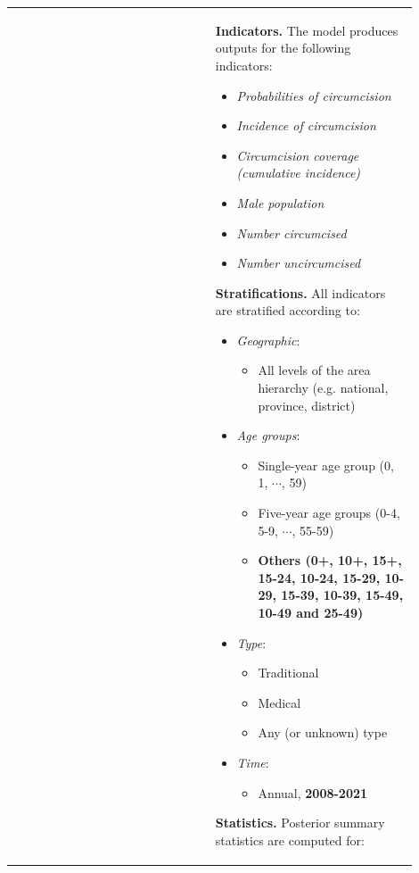 \documentclass{article}
\begin{document}
\begin{appendix}
{\begin{table}[H]
\begin{tabular}{| p{0.45\linewidth} | p{0.45\linewidth} |}
		& 
			{\bf Indicators.}  The model produces outputs for the following indicators:
			\begin{itemize}
				\item {\it Probabilities of circumcision}
                \item {\it Incidence of circumcision}
				\item {\it Circumcision coverage (cumulative incidence)}
				\item {\it Male population}
				\item {\it Number circumcised}
				\item {\it Number uncircumcised}
			\end{itemize}
			\vspace{5pt}
			{\bf Stratifications.} All indicators are stratified according to: 
			\begin{itemize}
				\item {\it Geographic}: 
				\begin{itemize}
					\item All levels of the area hierarchy (e.g. national, province, district)
				\end{itemize}
				\item {\it Age groups}: 
				\begin{itemize}
					\item Single-year age group (0, 1, $\cdots$, 59)
					\item Five-year age groups (0-4, 5-9, $\cdots$, 55-59)
					\item {\color{red}\bf Others (0+, 10+, 15+, 15-24, 10-24, 15-29, 10-29, 15-39, 10-39, 15-49, 10-49 and 25-49)}
				\end{itemize}
				\item {\it Type}: 
				\begin{itemize}
					\item Traditional
					\item Medical 
					\item Any (or unknown) type 
				\end{itemize}
				\item {\it Time}: 
				\begin{itemize}
					\item Annual, {\color{red}\bf 2008-2021}
				\end{itemize}
			\end{itemize}
			\vspace{5pt}
			{\bf Statistics.} Posterior summary statistics are computed for:
			\begin{itemize}

\end{itemize}
\end{tabular}
\end{table}}
\end{appendix}
\end{document}
